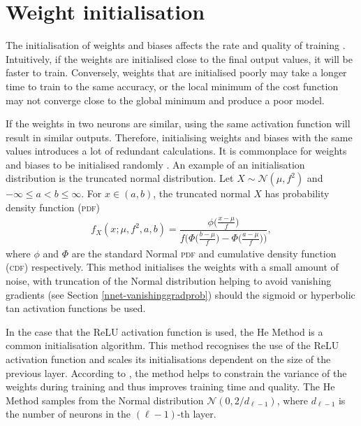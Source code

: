 
\section{Weight initialisation}

The initialisation of weights and biases affects the rate and quality of training \citep{Mishkin2016}. Intuitively, if the weights are initialised close to the final output values, it will be faster to train. Conversely, weights that are initialised poorly may take a longer time to train to the same accuracy, or the local minimum of the cost function may not converge close to the global minimum and produce a poor model.

If the weights in two neurons are similar, using the same activation function will result in similar outputs. Therefore, initialising weights and biases with the same values introduces a lot of redundant calculations. It is commonplace for weights and biases to be initialised randomly \citep{Nielson2015}. An example of an initialisation distribution is the truncated normal distribution. Let $X\sim\mathcal{N}(\mu,f^2)$ and $-\infty \le a < b \le \infty$. For $x \in (a,b)$, the truncated normal $X$ has probability density function (\textsc{pdf})
\begin{align}
	f_X(x;\mu, f^2,a,b) = \dfrac{\phi\big(\frac{x-\mu}{f}\big)}{f\bigg(\Phi\big(\frac{b-\mu}{f}\big) - \Phi\big(\frac{a-\mu}{f}\big)\bigg)},
\end{align}
where $\phi$ and $\Phi$ are the standard Normal \textsc{pdf} and cumulative density function (\textsc{cdf}) respectively. This method initialises the weights with a small amount of noise, with truncation of the Normal distribution helping to avoid vanishing gradients (see Section \ref{nnet-vanishinggradprob}) should the sigmoid or hyperbolic tan activation functions be used.

In the case that the ReLU activation function is used, the He Method \citep{HeKaiming2015DDiR} is a common initialisation algorithm. This method recognises the use of the ReLU activation function and scales its initialisations dependent on the size of the previous layer. According to \cite{HeKaiming2015DDiR}, the method helps to constrain the variance of the weights during training and thus improves training time and quality. The He Method samples from the Normal distribution $\mathcal{N}\left(0, 2/d_{\ell-1}\right)$, where $d_{\ell-1}$ is the number of neurons in the $(\ell-1)$-th layer.

